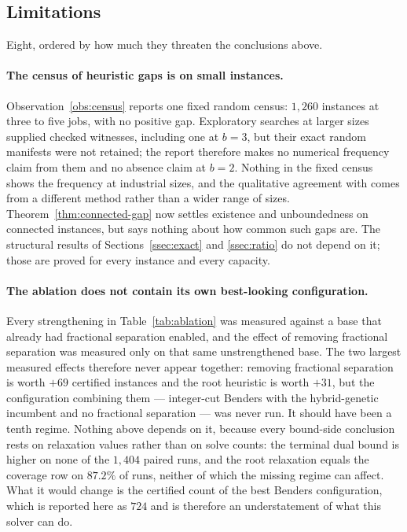\subsection{Limitations}\label{ssec:limits}

Eight, ordered by how much they threaten the conclusions above.

\paragraph{The census of heuristic gaps is on small instances.}
Observation~\ref{obs:census} reports one fixed random census: $1{,}260$ instances at
three to five jobs, with no positive gap. Exploratory searches at larger sizes supplied
checked witnesses, including one at $b=3$, but their exact random manifests were not
retained; the report therefore makes no numerical frequency claim from them and no
absence claim at $b=2$. Nothing in the fixed census shows the frequency at industrial
sizes, and the qualitative agreement with \citet{Burger2015} comes from a different
method rather than a wider range of sizes. Theorem~\ref{thm:connected-gap} now settles
existence and unboundedness on connected instances, but says nothing about how common
such gaps are. The structural results of
Sections~\ref{ssec:exact} and \ref{ssec:ratio} do not depend on it; those are proved for
every instance and every capacity.

\paragraph{The ablation does not contain its own best-looking configuration.}
Every strengthening in Table~\ref{tab:ablation} was measured against a base that already
had fractional separation enabled, and the effect of removing fractional separation was
measured only on that same unstrengthened base. The two largest measured effects therefore
never appear together: removing fractional separation is worth $+69$ certified instances
and the root heuristic is worth $+31$, but the configuration combining them --- integer-cut
Benders with the hybrid-genetic incumbent and no fractional separation --- was never run.
It should have been a tenth regime. Nothing above depends on it, because every
bound-side conclusion rests on relaxation values rather than on solve counts: the terminal
dual bound is higher on none of the $1{,}404$ paired runs, and the root relaxation equals
the coverage row on $87.2\%$ of runs, neither of which the missing regime can affect. What
it would change is the certified count of the best Benders configuration, which is reported
here as $724$ and is therefore an understatement of what this solver can do.

